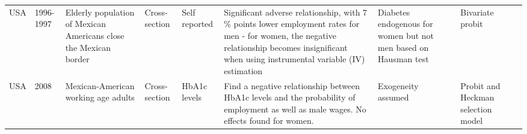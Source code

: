 \documentclass[10pt,letterpaper]{article}
\begin{document}
{\begin{landscape}
\begin{tabularx}{\linewidth}{m m m m b b b b m}
			USA       & 1996-1997  & Elderly population of Mexican Americans close the Mexican border & Cross-section           & Self reported                                & Significant adverse relationship, with 7 \% points lower employment rates for men - for women, the negative relationship becomes insignificant when using instrumental variable (IV) estimation                                                                                                                                                                                                                                                                                                                                                                                                                                                                  & Diabetes endogenous for women but not men based on Hausman test                         & Bivariate probit                                                                                                                                                                                                                                                                                     & \cite{Brown2005}            \\
			USA       & 2008       & Mexican-American working age adults                              & Cross-section           & HbA1c levels                                 & Find a negative  relationship between HbA1c levels and the probability of employment as well as male wages. No effects found for women.                                                                                                                                                                                                                                                                                                                                                                                                                                                                                                                      & Exogeneity assumed                                                                      & Probit and Heckman selection model                                                                                                                                                                                                                                                                   & \cite{BrownIII2011}            \\

\end{tabularx}
\end{landscape}}
\end{document}
